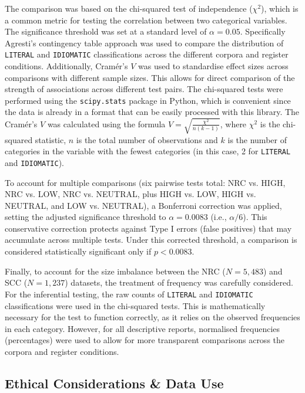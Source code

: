 \documentclass[11pt,a4paper]{article}
\begin{document}
The comparison was based on the chi-squared test of independence ($\chi^2$), which is a common metric for testing the correlation between two categorical variables. The significance threshold was set at a standard level of $\alpha = 0.05$. Specifically Agresti's \parencite*{agrestiCategoricalData2012} contingency table approach was used to compare the distribution of \texttt{LITERAL} and \texttt{IDIOMATIC} classifications across the different corpora and register conditions. Additionally, Cramér's $V$ \parencite*{cramer1946mathematical} was used to standardise effect sizes across comparisons with different sample sizes. This allows for direct comparison of the strength of associations across different test pairs. The chi-squared tests were performed using the \texttt{scipy.stats} package in Python, which is convenient since the data is already in a format that can be easily processed with this library. The Cramér's $V$ was calculated using the formula $V = \sqrt{\frac{\chi^2}{n(k-1)}}$, where $\chi^2$ is the chi-squared statistic, $n$ is the total number of observations and $k$ is the number of categories in the variable with the fewest categories (in this case, 2 for \texttt{LITERAL} and \texttt{IDIOMATIC}).

To account for multiple comparisons (six pairwise tests total: NRC vs. HIGH, NRC vs. LOW, NRC vs. NEUTRAL, plus HIGH vs. LOW, HIGH vs. NEUTRAL, and LOW vs. NEUTRAL), a Bonferroni correction \parencite{dunn1961multiple} was applied, setting the adjusted significance threshold to $\alpha = 0.0083$ (i.e., $\alpha/6$). This conservative correction protects against Type I errors (false positives) that may accumulate across multiple tests. Under this corrected threshold, a comparison is considered statistically significant only if $p < 0.0083$.

Finally, to account for the size imbalance between the NRC ($N=5{,}483$) and SCC ($N=1{,}237$) datasets, the treatment of frequency was carefully considered. For the inferential testing, the raw counts of \texttt{LITERAL} and \texttt{IDIOMATIC} classifications were used in the chi-squared tests. This is mathematically necessary for the test to function correctly, as it relies on the observed frequencies in each category. However, for all descriptive reports, normalised frequencies (percentages) were used to allow for more transparent comparisons across the corpora and register conditions. 

\subsection{Ethical Considerations \& Data Use}\label{subsec:ethical-considerations}
\end{document}

